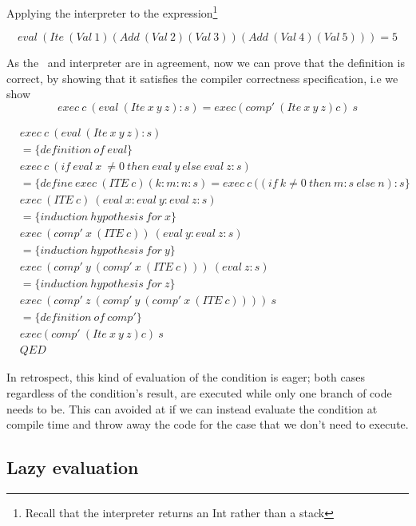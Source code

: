 \documentclass {article}
\begin{document}
Applying the interpreter to the expression\footnote{
Recall that the interpreter returns an Int rather than a stack}

	\[ eval \ (Ite \ (Val \ 1) (Add \ (Val \ 2) (Val \ 3)) (Add \ (Val \ 4) (Val \ 5))) = 5\]

As the \vm\ and interpreter are in agreement,
now we can prove that the definition is correct,
by showing that it satisfies the compiler 
correctness specification,
i.e we show 
	\[ exec \ c \ (eval \ (Ite \ x \ y \ z):s) = exec (comp' \ (Ite \ x \ y \ z) c)  \ s  \]

\begin{align*}
	&exec \ c \ (eval \ (Ite \ x \ y \ z):s) \\
	&= \{definition \ of \ eval\} \\ 
	&exec \ c \ (if \ eval \ x \ \not= 0 \ then \ eval \ y \ else \ eval \ z :s) \\
	&= \{define\: exec \ (ITE \ c) (k : m : n : s) = exec \ c \ ((if \ k \not=0 \ then \ m : s\ else \ n) : s \} \\
	& exec \ (ITE \ c) \ (eval \ x : eval \ y : eval \ z : s) \\
	&= \{induction\ hypothesis \ for \ x \} \\
	& exec \ (comp' \ x \ (ITE \ c)) \ (eval \ y : eval \ z : s) \\
	&= \{induction\ hypothesis \ for \ y \} \\
	& exec \ (comp' \ y \ (comp' \ x \ (ITE \ c))) \ (eval \ z : s) \\
	&= \{induction\ hypothesis \ for \ z\} \\
	& exec \ (comp' \ z \ (comp' \ y \ (comp' \ x \ (ITE \ c)))) \ s \\
	&= \{definition \ of \ comp' \} \\
	& exec (comp' \ (Ite \ x \ y \ z) c)  \ s \\
	&QED
\end{align*} 

In retrospect, this kind of evaluation of the condition
is eager; both cases regardless of the
condition's result, are executed
while only one branch of code needs to be.
This can avoided at if we can instead
evaluate the condition at compile time
and throw away the code for the case
that we don't need to execute.

\subsection{Lazy evaluation}
\end{document}
